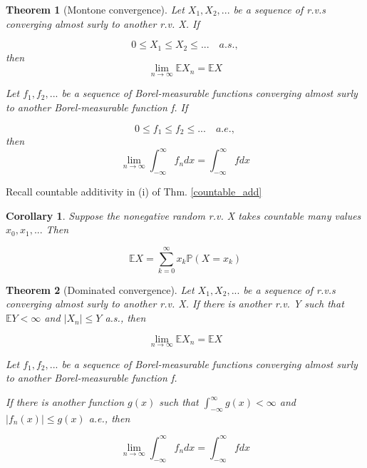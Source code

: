 \documentclass[a4]{article}
\newtheorem{theorem}{Theorem}
\newtheorem{corollary}{Corollary}
\begin{document}
\begin{theorem}[Montone convergence]
	\quad \par \bigbreak 
	Let $X_{1}, X_{2},...$ be a sequence of r.v.s converging almost surly to another r.v. X. If \par 
	$$
	0\leq X_{1}\leq X_{2}\leq ... \quad a.s.,
	$$
	then
	$$
	\lim_{n\rightarrow \infty}\mathbb{E}X_{n} = \mathbb{E}X
	$$
		\quad \par \bigbreak 
	Let $f_{1}, f_{2},...$ be a sequence of Borel-measurable functions converging almost surly to another Borel-measurable function f. If \par 
	$$
	0\leq f_{1}\leq f_{2}\leq ... \quad a.e.,
	$$
	then
	$$
	\lim_{n\rightarrow \infty}\int_{-\infty}^{\infty}f_{n}dx = \int_{-\infty}^{\infty} f dx
	$$
\end{theorem}
Recall countable additivity in (i) of Thm. \ref{countable_add}\par 
\begin{corollary}
	Suppose the nonegative random r.v. X takes countable many values $x_{0},x_{1},...$ Then\par 
	$$
	\mathbb{E}X = \sum^{\infty}_{k = 0}x_{k}\mathbb{P}(X = x_{k})
	$$
\end{corollary}
\begin{theorem}[Dominated convergence]
		\quad \par \bigbreak 
	Let $X_{1}, X_{2},...$ be a sequence of r.v.s converging almost surly to another r.v. X. If  there is another r.v. Y such that $\mathbb{E}Y<\infty$ and $|X_{n}|\leq Y$ a.s., then \par 

	$$
	\lim_{n\rightarrow \infty}\mathbb{E}X_{n} = \mathbb{E}X
	$$
	\quad \par \bigbreak 
	Let $f_{1}, f_{2},...$ be a sequence of Borel-measurable functions converging almost surly to another Borel-measurable function f.\par  If there is another function $g(x)$ such that $\int^{\infty}_{-\infty}g(x)<\infty$ and $|f_{n}(x)|\leq g(x)$ a.e., then\par 

	$$
	\lim_{n\rightarrow \infty}\int_{-\infty}^{\infty}f_{n}dx = \int_{-\infty}^{\infty} f dx
	$$
\end{theorem}
\end{document}
